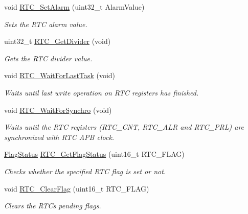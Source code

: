 \begin{DoxyCompactItemize}
void \hyperlink{group___r_t_c___private___functions_gaec644c636a30ab5e287ba60ffc77132c}{R\+T\+C\+\_\+\+Set\+Alarm} (uint32\+\_\+t Alarm\+Value)
\begin{DoxyCompactList}\small\item\em Sets the R\+TC alarm value. \end{DoxyCompactList}\item 
uint32\+\_\+t \hyperlink{group___r_t_c___private___functions_gaa4f00e0469fedcf6cbf23760e6d801ed}{R\+T\+C\+\_\+\+Get\+Divider} (void)
\begin{DoxyCompactList}\small\item\em Gets the R\+TC divider value. \end{DoxyCompactList}\item 
void \hyperlink{group___r_t_c___private___functions_gaa0a406ef860d5231748c5f0d82673036}{R\+T\+C\+\_\+\+Wait\+For\+Last\+Task} (void)
\begin{DoxyCompactList}\small\item\em Waits until last write operation on R\+TC registers has finished. \end{DoxyCompactList}\item 
void \hyperlink{group___r_t_c___private___functions_gaca4346e0dc15dccc15179786b28450db}{R\+T\+C\+\_\+\+Wait\+For\+Synchro} (void)
\begin{DoxyCompactList}\small\item\em Waits until the R\+TC registers (R\+T\+C\+\_\+\+C\+NT, R\+T\+C\+\_\+\+A\+LR and R\+T\+C\+\_\+\+P\+RL) are synchronized with R\+TC A\+PB clock. \end{DoxyCompactList}\item 
\hyperlink{group___exported__types_ga89136caac2e14c55151f527ac02daaff}{Flag\+Status} \hyperlink{group___r_t_c___private___functions_ga21a85e5f846cb4552d5e76420779f3f6}{R\+T\+C\+\_\+\+Get\+Flag\+Status} (uint16\+\_\+t R\+T\+C\+\_\+\+F\+L\+AG)
\begin{DoxyCompactList}\small\item\em Checks whether the specified R\+TC flag is set or not. \end{DoxyCompactList}\item 
void \hyperlink{group___r_t_c___private___functions_gacefb05730a77ffaa273c1ac3ade1a22f}{R\+T\+C\+\_\+\+Clear\+Flag} (uint16\+\_\+t R\+T\+C\+\_\+\+F\+L\+AG)
\begin{DoxyCompactList}\small\item\em Clears the R\+TC\textquotesingle{}s pending flags. \end{DoxyCompactList}\item 

\end{DoxyCompactItemize}
